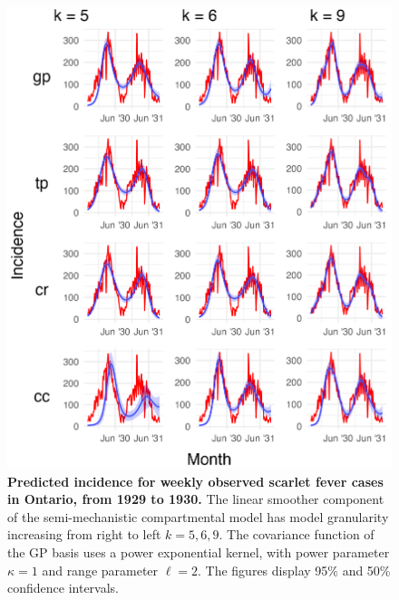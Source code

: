 \documentclass[
11pt, %
oneside, %
english, %
singlespacing, %
]{macthesis} %
\begin{document}
\begin{figure}[H]
\centering
\includegraphics[width=\textwidth, height = \textwidth]{figure/Scarlet/Scarlet_agg_k(5,8,10)_bsd1_beta1_gamma7_sd01_plot_incidence.png}
\caption[Predicted Scarlet Fever Incidence (1929-1930)]{\textbf{Predicted incidence for weekly observed scarlet fever cases in Ontario, from 1929 to 1930.} The linear smoother component of the semi-mechanistic compartmental model has model granularity increasing from right to left \(k= 5,6,9\).
The covariance function of the GP basis uses a power exponential kernel, with power parameter \(\kappa = 1\) and range parameter \(\ell = 2\).
The figures display 95\% and 50\% confidence intervals.}
\label{fig:scarlet_inc}
\end{figure}
\end{document}

